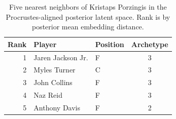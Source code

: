 \begin{table}[htbp]
  \centering\small
  \begin{tabular}{rllc}
    \toprule
    Rank & Player & Position & Archetype \\
    \midrule
    1 & Jaren Jackson Jr. & F & 3 \\
    2 & Myles Turner & C & 3 \\
    3 & John Collins & F & 3 \\
    4 & Naz Reid & F & 3 \\
    5 & Anthony Davis & F & 2 \\
    \bottomrule
  \end{tabular}
  \caption{Five nearest neighbors of Kristaps Porzingis in the Procrustes-aligned posterior latent space. Rank is by posterior mean embedding distance.}
  \label{tab:Kristaps_Porzingis_neighbors}
\end{table}


